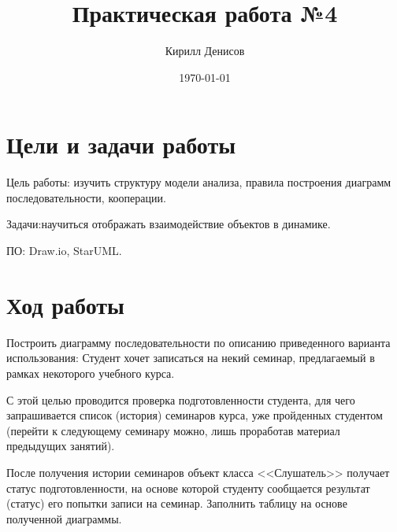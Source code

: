 \documentclass[a4paper,14pt]{extarticle}
\author{Кирилл Денисов}
\title{Практическая работа №4}
\date{\today}
\newcommand{\pathToCommonFolder}{/home/denilai/Desktop/LaTeX/Common}
\begin{document}
\thispagestyle{empty}



\newpage
\tableofcontents
\newpage	
\section{Цели и задачи работы}
Цель работы: изучить структуру модели анализа, правила построения диаграмм последовательности, кооперации.

Задачи:научиться отображать взаимодействие объектов в динамике.

ПО: Draw.io, StarUML.

\section{Ход работы}
\begin{problem}
Построить диаграмму последовательности по описанию приведенного
варианта использования: Студент хочет записаться на некий семинар,
предлагаемый в рамках некоторого учебного курса.

С этой целью проводится
проверка подготовленности студента, для чего запрашивается список
(история) семинаров курса, уже пройденных студентом (перейти к
следующему семинару можно, лишь проработав материал предыдущих
занятий).

После получения истории семинаров объект класса <<Слушатель>> получает статус подготовленности, на основе которой студенту сообщается
результат (статус) его попытки записи на семинар.
Заполнить таблицу на основе полученной диаграммы.
\end{problem}
\end{document}
